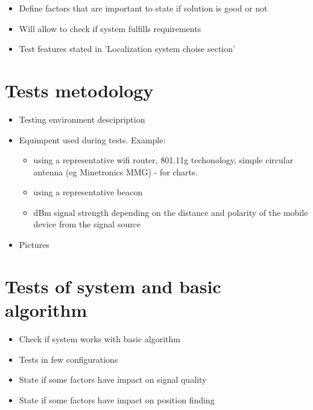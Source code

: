\documentclass[../main.tex]{subfiles}
\begin{document}
\begin{itemize}
	\item Define factors that are important to state if solution is good or not
	\item Will allow to check if system fulfills requirements
	\item Test features stated in 'Localization system choise section'
\end{itemize}


\section{Tests metodology} %
\label{sec:tests_metodology}

\begin{itemize}
	\item Testing environment descipription
	\item Equimpent used during tests. Example:
	\begin{itemize}
		\item using a representative wifi router, 801.11g techonology, simple circular antenna (eg Minetronics MMG) - for charts.
		\item using a representative beacon
		\item dBm signal strength depending on the distance and polarity of the mobile device from the signal source
	\end{itemize}
	\item Pictures
\end{itemize}


\section{Tests of system and basic algorithm} %
\label{sec:tests_of_system_and_basic_algorithm}
\begin{itemize}
	\item Check if system works with basic algorithm
	\item Tests in few configurations
	\item State if some factors have impact on signal quality
	\item State if some factors have impact on position finding
\end{itemize}
\end{document}
